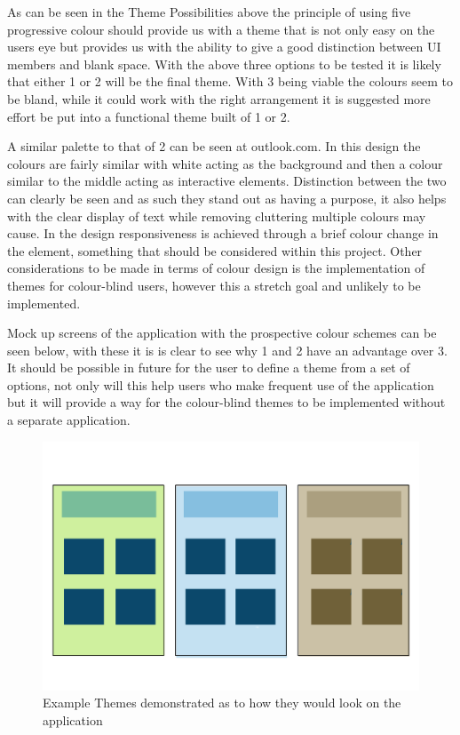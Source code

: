 \newpage
As can be seen in the Theme Possibilities above  the principle of using five progressive colour should provide us with a theme that is not only easy on the users eye but provides us with the ability to give a good distinction between UI members and blank space. With the above three options to be tested it is likely that either 1 or 2 will be the final theme. With 3 being viable the colours seem to be bland, while it could work with the right arrangement it is suggested more effort be put into a functional theme built of 1 or 2. 

A similar palette to that of 2 can be seen at outlook.com\cite{out}. In this design the colours are fairly similar with white acting as the background and then a colour similar to the middle acting as interactive elements. Distinction between the two can clearly be seen and as such they stand out as having a purpose, it also helps with the clear display of text while removing cluttering multiple colours may cause. In the design responsiveness is achieved through a brief colour change in the element, something that should be considered within this project. Other considerations to be made in terms of colour design is the implementation of themes for colour-blind users, however this a stretch goal and unlikely to be implemented. 

Mock up screens of the application with the prospective colour schemes can be seen below, with these it is is clear to see why 1 and 2 have an advantage over 3. It should be possible in future for the user to define a theme from a set of options, not only will this help users who make frequent use of the application but it will provide a way for the colour-blind themes to be implemented without a separate application. \\
\begin{figure}
\includegraphics[scale=0.7]{Chapter2/themes.png} 
\caption[Example Themes]{Example Themes demonstrated as to how they would look on the application}
\end{figure}

